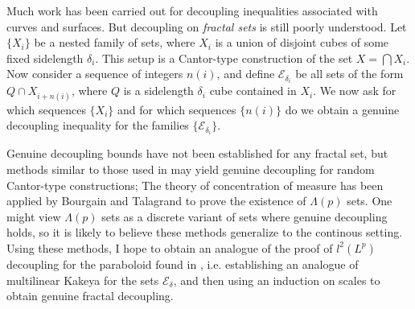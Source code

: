 \documentclass[11pt]{article}
\theoremstyle{definition}
\begin{document}
Much work has been carried out for decoupling inequalities associated with curves and surfaces. But decoupling on \emph{fractal sets} is still poorly understood. Let $\{ X_i \}$ be a nested family of sets, where $X_i$ is a union of disjoint cubes of some fixed sidelength $\delta_i$. This setup is a Cantor-type construction of the set $X = \bigcap X_i$. Now consider a sequence of integers $n(i)$, and define $\mathcal{E}_{\delta_i}$ be all sets of the form $Q \cap X_{i + n(i)}$, where $Q$ is a sidelength $\delta_i$ cube contained in $X_i$. We now ask for which sequences $\{ X_i \}$ and for which sequences $\{ n(i) \}$ do we obtain a genuine decoupling inequality for the families $\{ \mathcal{E}_{\delta_i} \}$.

Genuine decoupling bounds have not been established for any fractal set, but methods similar to those used in \cite{DensonFourier} may yield genuine decoupling for random Cantor-type constructions; The theory of concentration of measure has been applied by Bourgain \cite{Bourgain} and Talagrand \cite{Talagrand} to prove the existence of $\Lambda(p)$ sets. %
One might view $\Lambda(p)$ sets as a discrete variant of sets where genuine decoupling holds, so it is likely to believe these methods generalize to the continous setting. Using these methods, I hope to obtain an analogue of the proof of $l^2(L^p)$ decoupling for the paraboloid found in \cite{BourgainDemeterStudyGuide}, i.e. establishing an analogue of multilinear Kakeya for the sets $\mathcal{E}_\delta$, and then using an induction on scales to obtain genuine fractal decoupling.

\AtNextBibliography{\footnotesize}
\printbibliography
\end{document}
